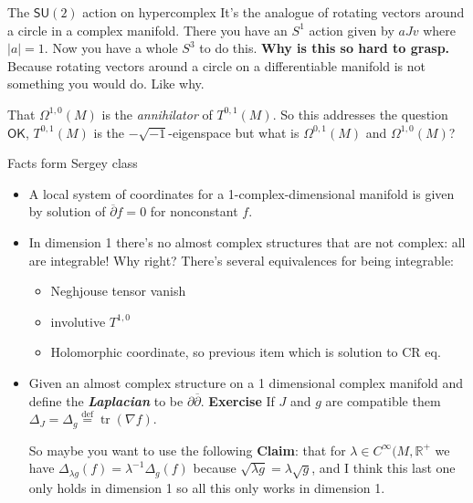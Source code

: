 \begin{thing7}{The \(\mathsf{SU}(2)\) action on hypercomplex}\leavevmode
It's the analogue of rotating vectors around a circle in a complex manifold. There you have an \(S^1\) action given by \(a Jv\) where \(|a|=1\). Now you have a whole  \(S^3\) to do this. \textbf{Why is this so hard to grasp.} Because rotating vectors around a circle on a differentiable manifold is not something you would do. Like why.
\end{thing7}

\begin{remark}\leavevmode
	That \(\Omega^{1,0}(M)\) is the \textit{annihilator} of \(T^{0,1}(M)\). So this addresses the question $\mathsf{OK}$, \(T^{0,1}(M)\) is the \(- \sqrt{-1}\)-eigenspace but what is \(\Omega^{0,1}(M)\) and \(\Omega^{1,0}(M)\)?
\end{remark}

\begin{thing6}{Facts form Sergey class}\leavevmode
\begin{itemize}
	\item A local system of coordinates for a 1-complex-dimensional manifold is given by solution of  \(\overline{\partial}f=0\) for nonconstant \(f\).
	\item In dimension 1 there's no almost complex structures that are not complex: all are integrable! Why right? There's several equivalences for being integrable:
\begin{itemize}
\item Neghjouse tensor vanish
\item involutive \(T^{1,0}\) 
\item Holomorphic coordinate, so previous item which is solution to CR eq.
\end{itemize}
\item Given an almost complex structure on a 1 dimensional complex manifold and define the \textit{\textbf{Laplacian}} to be \(\partial \overline{\partial}\). \textbf{Exercise} If \(J\) and \(g\) are compatible them \(\Delta_J = \Delta_g\overset{\operatorname{def}}{=}\operatorname{tr}(\nabla f)\).

	So maybe you want to use the following \textbf{Claim}: that for \(\lambda \in C^\infty(M,\mathbb{R}^+\) we have \(\Delta_{\lambda g}(f)=\lambda^{-1}\Delta_g(f)\) because \(\sqrt{\lambda g}=\lambda \sqrt{g}  \), and I think this last one only holds in dimension 1 so all this only works in dimension 1.
\end{itemize}

\end{thing6}

